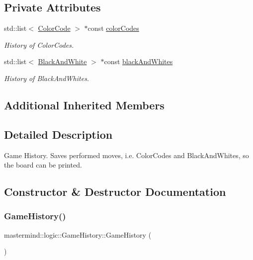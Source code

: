 \subsection*{Private Attributes}
\begin{DoxyCompactItemize}
\item 
std\+::list$<$ \hyperlink{classmastermind_1_1logic_1_1_color_code}{Color\+Code} $>$ $\ast$const \hyperlink{classmastermind_1_1logic_1_1_game_history_a988bbccc372956773078e0e32344c1a9}{color\+Codes}
\begin{DoxyCompactList}\small\item\em History of Color\+Codes. \end{DoxyCompactList}\item 
std\+::list$<$ \hyperlink{classmastermind_1_1logic_1_1_black_and_white}{Black\+And\+White} $>$ $\ast$const \hyperlink{classmastermind_1_1logic_1_1_game_history_a60245b7b841a34c318dadfb953b4f512}{black\+And\+Whites}
\begin{DoxyCompactList}\small\item\em History of Black\+And\+Whites. \end{DoxyCompactList}\end{DoxyCompactItemize}
\subsection*{Additional Inherited Members}


\subsection{Detailed Description}
Game History. Saves performed moves, i.\+e. Color\+Codes and Black\+And\+Whites, so the board can be printed. 

\subsection{Constructor \& Destructor Documentation}
\hypertarget{classmastermind_1_1logic_1_1_game_history_a4731c4c94790c94c5f5e72a5ef344602}{}\label{classmastermind_1_1logic_1_1_game_history_a4731c4c94790c94c5f5e72a5ef344602} 
\subsubsection{\texorpdfstring{Game\+History()}{GameHistory()}}
{\footnotesize\ttfamily mastermind\+::logic\+::\+Game\+History\+::\+Game\+History (\begin{DoxyParamCaption}{ }\end{DoxyParamCaption})}



